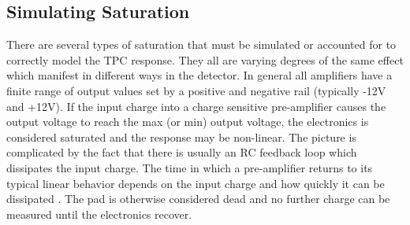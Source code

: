 \subsection{Simulating Saturation}




There are several types of saturation that must be simulated or accounted for to correctly model the TPC response. They all are varying degrees of the same effect which manifest in different ways in the detector. In general all amplifiers have a finite range of output values set by a positive and negative rail (typically -12V and +12V). If the input charge into a charge sensitive pre-amplifier causes the output voltage to reach the max (or min) output voltage, the electronics is considered saturated and the response may be non-linear. The picture is complicated by the fact that there is usually an RC feedback loop which dissipates the input charge. The time in which a pre-amplifier returns to its typical linear behavior depends on the input charge and how quickly it can be dissipated \cite{akiGET}. The pad is otherwise considered dead and no further charge can be measured until the electronics recover. 
 
